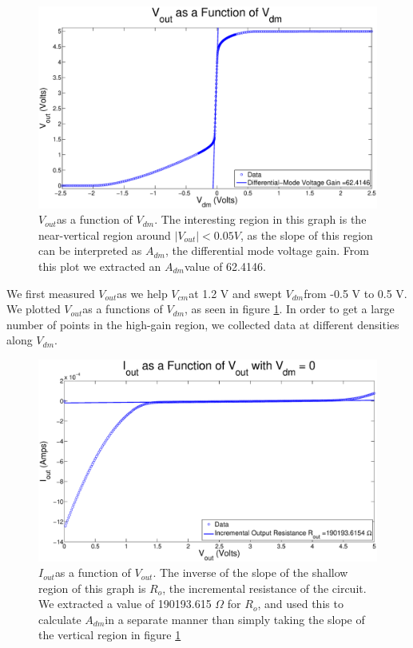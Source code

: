 \documentclass{article}
\newcommand{\Vout}{{$V_{out}$}}
\newcommand{\Vcm}{{$V_{cm}$}}
\newcommand{\Vdm}{{$V_{dm}$}}
\newcommand{\Iout}{{$I_{out}$}}
\newcommand{\Adm}{{$A_{dm}$}}
\newcommand{\Ro}{{$R_{o}$}}
\begin{document}
\begin{figure}[H]
\centering
\includegraphics[width=\linewidth]{../Figures/Exp2P1.eps}
\caption{\Vout as a function of \Vdm. The interesting region in this graph is the near-vertical region around $|V_{out}| < 0.05 V$, as the slope of this region can be interpreted as \Adm, the differential mode voltage gain. From this plot we extracted an \Adm value of 62.4146.}
\label{fig:exp2p1}
\end{figure}

We first measured \Vout as we help \Vcm at 1.2 V and swept \Vdm from -0.5 V to 0.5 V. We plotted \Vout as a functions of \Vdm, as seen in figure \ref{fig:exp2p1}. In order to get a large number of points in the high-gain region, we collected data at different densities along \Vdm.

\begin{figure}[H]
\centering
\includegraphics[width=\linewidth]{../Figures/Exp2P2.eps}
\caption{\Iout as a function of \Vout. The inverse of the slope of the shallow region of this graph is \Ro, the incremental resistance of the circuit. We extracted a value of 190193.615 $\Omega$ for \Ro, and used this to calculate \Adm in a separate manner than simply taking the slope of the vertical region in figure \ref{fig:exp2p1}}
\label{fig:exp2p2}
\end{figure}
\end{document}
